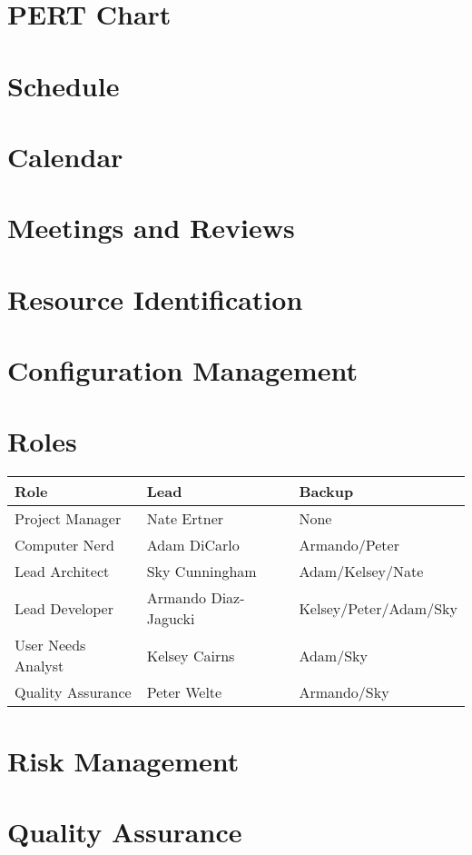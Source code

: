 \documentclass[11pt]{article}
\begin{document}
\section{PERT Chart}
\section{Schedule}
\section{Calendar}
\section{Meetings and Reviews}
\section{Resource Identification}
\section{Configuration Management}
\section{Roles}

\begin{tabular}{|l|l|l|}
 \hline
\textbf{Role} & \textbf{Lead} & \textbf{Backup}  \\ \hline
Project Manager & Nate Ertner & None\\ \hline
Computer Nerd & Adam DiCarlo  & Armando/Peter\\ \hline
Lead Architect & Sky Cunningham  & Adam/Kelsey/Nate \\ \hline
Lead Developer & Armando Diaz-Jagucki & Kelsey/Peter/Adam/Sky \\ \hline
User Needs Analyst & Kelsey Cairns & Adam/Sky \\ \hline
Quality Assurance & Peter Welte  & Armando/Sky \\ \hline

\end{tabular}


\section{Risk Management}
\section{Quality Assurance}
\end{document}
